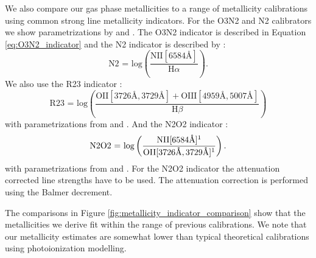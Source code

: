 \documentclass[fleqn,usenatbib]{mnras}
\begin{document}
We also compare our gas phase metallicities to a range of metallicity calibrations using common strong line metallicity indicators. For the O3N2 and N2 calibrators we show parametrizations by \cite{pettini2004, nagao2006, maiolino2008, marino2013, brown2016} and \cite{curti2017}. The O3N2 indicator is described in Equation \ref{eq:O3N2_indicator} and the N2 indicator is described by \citep{storchi-bergmann1994}:
\begin{equation}
    \textrm{N2 = log}\left(\frac{\textrm{NII} [6584\textrm{\AA}]}{\textrm{H}\alpha}\right).
\end{equation}
We also use the R23 indicator \citep{pagel1979}:
\begin{equation}
    \textrm{R23 = log}\left(\frac{\textrm{OII} [3726\textrm{\AA}, 3729\textrm{\AA}] + \textrm{OIII} [4959\textrm{\AA}, 5007\textrm{\AA}]}{\textrm{H}\beta}\right)
\end{equation}
with parametrizations from \cite{mcgaugh1991, zaritsky1994, nagao2006, maiolino2008} and \cite{curti2017}. And the N2O2 indicator \citep{alloin1979}:
\begin{equation}
    \textrm{N2O2 = log}\left(\frac{\textrm{NII} [6584\textrm{\AA}]\textrm{\footnotemark[1]}}{\textrm{OII} [3726\textrm{\AA}, 3729\textrm{\AA}]\textrm{\footnotemark[1]}}\right).
\end{equation}
with parametrizations from \cite{kewley2002, nagao2006} and \cite{brown2016}. For the N2O2 indicator the attenuation corrected line strengths have to be used. The attenuation correction is performed using the Balmer decrement. 

The comparisons in Figure \ref{fig:metallicity_indicator_comparison} show that the metallicities we derive fit within the range of previous calibrations. We note that our metallicity estimates are somewhat lower than typical theoretical calibrations using photoionization modelling.
\end{document}
